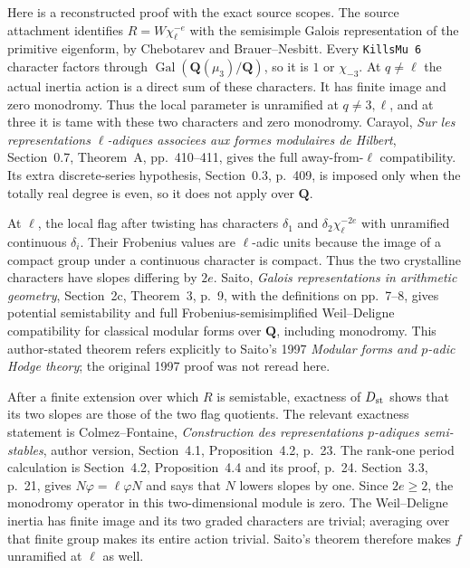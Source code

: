 \documentclass[11pt,a4paper]{article}
\theoremstyle{definition}
\begin{document}
Here is a reconstructed proof with the exact source scopes.
The source attachment identifies $R=W\chi_\ell^{-e}$ with
the semisimple Galois representation of the primitive eigenform,
by Chebotarev and Brauer--Nesbitt.
Every \texttt{KillsMu 6} character factors through
$\operatorname{Gal}(\mathbf Q(\mu_3)/\mathbf Q)$, so it is
$1$ or $\chi_{-3}$.
At $q\ne\ell$ the actual inertia action is a direct sum of these
characters. It has finite image and zero monodromy.
Thus the local parameter is unramified at $q\ne3,\ell$, and at
three it is tame with these two characters and zero monodromy.
Carayol, \emph{Sur les representations $\ell$-adiques associees
aux formes modulaires de Hilbert}, Section~0.7, Theorem~A,
pp.~410--411, gives the full away-from-$\ell$ compatibility.
Its extra discrete-series hypothesis, Section~0.3, p.~409,
is imposed only when the totally real degree is even, so it
does not apply over $\mathbf Q$.

At $\ell$, the local flag after twisting has characters
$\delta_1$ and $\delta_2\chi_\ell^{-2e}$ with unramified
continuous $\delta_i$.
Their Frobenius values are $\ell$-adic units because the image
of a compact group under a continuous character is compact.
Thus the two crystalline characters have slopes differing by $2e$.
Saito, \emph{Galois representations in arithmetic geometry},
Section~2c, Theorem~3, p.~9, with the definitions on pp.~7--8,
gives potential semistability and full Frobenius-semisimplified
Weil--Deligne compatibility for classical modular forms over
$\mathbf Q$, including monodromy. This author-stated theorem
refers explicitly to Saito's 1997 \emph{Modular forms and $p$-adic
Hodge theory}; the original 1997 proof was not reread here.

After a finite extension over which $R$ is semistable, exactness
of $D_{\rm st}$ shows that its two slopes are those of the two
flag quotients. The relevant exactness statement is
Colmez--Fontaine, \emph{Construction des representations $p$-adiques
semi-stables}, author version, Section~4.1, Proposition~4.2,
p.~23. The rank-one period calculation is Section~4.2,
Proposition~4.4 and its proof, p.~24.
Section~3.3, p.~21, gives $N\varphi=\ell\varphi N$ and says
that $N$ lowers slopes by one. Since $2e\geq2$, the monodromy
operator in this two-dimensional module is zero.
The Weil--Deligne inertia has finite image and its two graded
characters are trivial; averaging over that finite group makes
its entire action trivial. Saito's theorem therefore makes $f$
unramified at $\ell$ as well.
\end{document}
